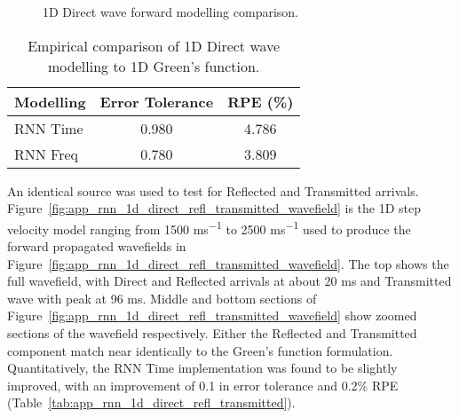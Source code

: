 \begin{figure}[!ht]
        \centering

        \caption[1D Direct wave forward modelling comparison.]{1D Direct wave forward modelling comparison.}        
        \label{fig:app_rnn_1d_direct_results}
\end{figure}

\begin{table*}[!ht]
        \footnotesize
        \centering
        \begin{tabular}{@{}lcc@{}}\toprule
Modelling  & Error Tolerance    & RPE (\%) \\ \hline
RNN Time   & 0.980 & 4.786                           \\
RNN Freq   & 0.780 & 3.809                           \\ \hline
        \end{tabular}
        \caption{Empirical comparison of 1D Direct wave modelling to 1D Green's function.}\label{tab:app_rnn_1d_direct}
\end{table*}

An identical source was used to test for Reflected and Transmitted arrivals. Figure~\ref{fig:app_rnn_1d_direct_refl_transmitted_wavefield} is the 1D step velocity model ranging from 1500 \si{ms^{-1}} to 2500 \si{ms^{-1}} used to produce the forward propagated wavefields in Figure~\ref{fig:app_rnn_1d_direct_refl_transmitted_wavefield}. The top shows the full wavefield, with Direct and Reflected arrivals at about 20 ms and Transmitted wave with peak at 96 ms. Middle and bottom sections of Figure~\ref{fig:app_rnn_1d_direct_refl_transmitted_wavefield} show zoomed sections of the wavefield respectively. Either the Reflected and Transmitted component match near identically to the Green’s function formulation. Quantitatively, the RNN Time implementation was found to be slightly improved, with an improvement of 0.1 in error tolerance and 0.2\% RPE (Table~\ref{tab:app_rnn_1d_direct_refl_transmitted}).


